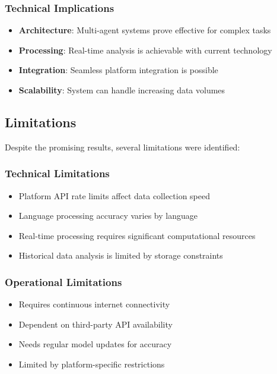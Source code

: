 \subsubsection{Technical Implications}
\begin{itemize}
    \item \textbf{Architecture}: Multi-agent systems prove effective for complex tasks
    \item \textbf{Processing}: Real-time analysis is achievable with current technology
    \item \textbf{Integration}: Seamless platform integration is possible
    \item \textbf{Scalability}: System can handle increasing data volumes
\end{itemize}

\subsection{Limitations}
Despite the promising results, several limitations were identified:

\subsubsection{Technical Limitations}
\begin{itemize}
    \item Platform API rate limits affect data collection speed
    \item Language processing accuracy varies by language
    \item Real-time processing requires significant computational resources
    \item Historical data analysis is limited by storage constraints
\end{itemize}

\subsubsection{Operational Limitations}
\begin{itemize}
    \item Requires continuous internet connectivity
    \item Dependent on third-party API availability
    \item Needs regular model updates for accuracy
    \item Limited by platform-specific restrictions
\end{itemize}

